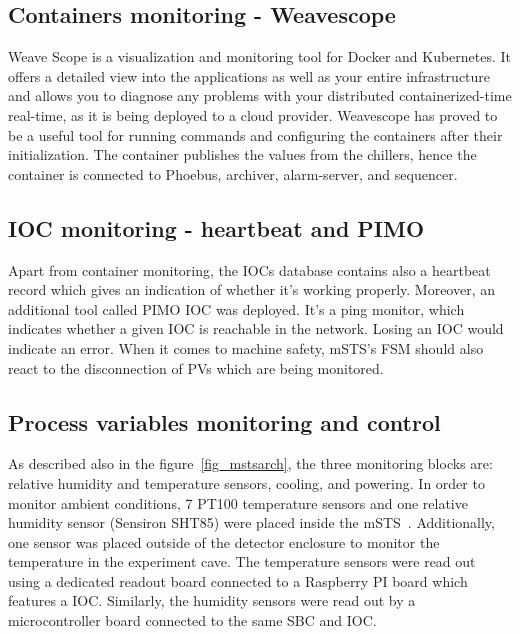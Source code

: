 \newpage
\subsection{Containers monitoring - Weavescope}

Weave Scope is a visualization and monitoring tool for Docker and Kubernetes. It offers a detailed view into the applications as well as your entire infrastructure and allows you to diagnose any problems with your distributed containerized-time real-time, as it is being deployed to a cloud provider. Weavescope has proved to be a useful tool for running commands and configuring the containers after their initialization. The container publishes the values from the chillers, hence the container is connected to Phoebus, archiver, alarm-server, and sequencer. 
\subsection{IOC monitoring - heartbeat and PIMO}
Apart from container monitoring, the \gls{IOC}s database contains also a heartbeat record which gives an indication of whether it's working properly. Moreover, an additional tool called PIMO \gls{IOC} was deployed. It's a ping monitor, which indicates whether a given \gls{IOC} is reachable in the network. Losing an \gls{IOC} would indicate an error. When it comes to machine safety, \gls{mSTS}'s \gls{FSM} should also react to the disconnection of PVs which are being monitored.
\subsection{Process variables monitoring and control}
As described also in the figure~\ref{fig_mstsarch}, the three monitoring blocks are: relative humidity and temperature sensors, cooling, and powering. In  order to monitor ambient conditions, 7 PT100 temperature sensors and one relative humidity sensor (Sensiron SHT85) were placed inside the \gls{mSTS}~\cite{SHT85}. Additionally, one sensor was placed outside of the detector enclosure to monitor the temperature in the experiment cave. The temperature sensors were read out using a dedicated readout board connected to a Raspberry PI board which features a \gls{IOC}. Similarly, the humidity sensors were read out by a microcontroller board connected to the same \gls{SBC} and \gls{IOC}.

